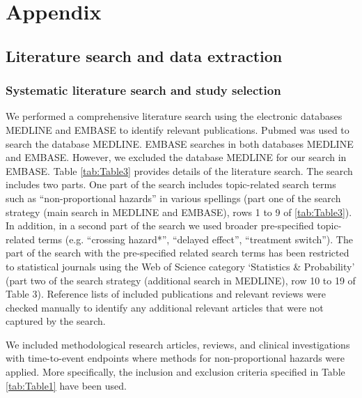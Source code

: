 
\appendix

\setcounter{table}{0}
\renewcommand*\thetable{\Alph{section}\arabic{table}}
\section{Appendix} \label{Appendix}

\noindent 
\subsection{Literature search and data extraction} \label{detailedMethodSection}
\subsubsection{Systematic literature search and study selection}

\noindent

\noindent We performed a comprehensive literature search using the electronic databases MEDLINE and EMBASE to identify relevant publications. Pubmed was used to search the database MEDLINE. EMBASE searches in both databases MEDLINE and EMBASE. However, we excluded the database MEDLINE for our search in EMBASE. Table \ref{tab:Table3} provides details of the literature search. 
The search includes two parts. One part of the search includes topic-related search terms such as “non-proportional hazards” in various spellings (part one of the search strategy (main search in MEDLINE and EMBASE), rows 1 to 9 of \ref{tab:Table3}). In addition, in a second part of the search we used broader pre-specified topic-related terms (e.g. “crossing hazard*”, “delayed effect”, “treatment switch”).
 The part of the search with the pre-specified related search terms has been restricted to statistical journals using the Web of Science category ‘Statistics \& Probability’ (part two of the search strategy (additional search in MEDLINE), row 10 to 19 of Table 3). Reference lists of included publications and relevant reviews were checked manually to identify any additional relevant articles that were not captured by the search.

\noindent We included methodological research articles, reviews, and clinical investigations with time-to-event endpoints where methods for non-proportional hazards were applied. More specifically, the inclusion and exclusion criteria specified in Table \ref{tab:Table1} have been used.

